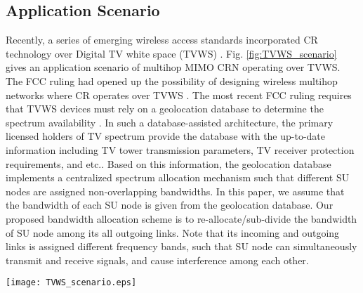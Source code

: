\documentclass[12pt,onecolumn,tworows]{IEEEtran}
\begin{document}
\subsection{Application Scenario}
Recently, a
series of emerging wireless access standards incorporated
CR technology over Digital TV white space (TVWS)\cite{TVoverview} .
Fig. \ref{fig:TVWS_scenario} gives an application scenario of multihop MIMO CRN operating over TVWS. The FCC ruling had opened up the possibility of designing wireless multihop networks where CR operates over TVWS \cite{FCC2012Database}. The most recent FCC ruling requires that TVWS devices must rely on a geolocation database to determine the spectrum availability \cite{Chen2013Database}\cite{Murty2012Database}. In such a database-assisted architecture, the primary licensed holders of TV spectrum provide the database with the up-to-date information including TV tower transmission parameters, TV receiver protection requirements, and etc..
Based on this information, the geolocation database implements a centralized spectrum allocation mechanism such that different SU nodes are assigned non-overlapping bandwidths. In this paper, we assume that the bandwidth of each SU node is given from the geolocation database. Our proposed bandwidth allocation scheme is to re-allocate/sub-divide the bandwidth of SU node among its all outgoing links.
Note that its incoming and outgoing links is assigned different frequency bands, such that  SU node can simultaneously transmit and receive signals, and
cause interference among each other.
\begin{figure*}
\centering
\texttt{[image: TVWS\_scenario.eps]}
\caption{An application scenario of multihop MIMO CRN operating over TVWS.}
\label{fig:TVWS_scenario}
\end{figure*}
\end{document}
